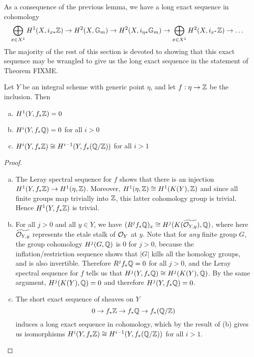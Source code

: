 As a consequence of the previous lemma, we have a long exact sequence in cohomology
\begin{equation}\label{les form1}
\bigoplus_{x\in X^1}H^1(X, i_{x*}\mathbb{Z}) \rightarrow H^2(X,\mathbb{G}_m)\rightarrow H^2(X,i_{\eta*}\mathbb{G}_m)\rightarrow \bigoplus_{x\in X^1}H^2(X, i_{x^*}\mathbb{Z})\rightarrow \dots
\end{equation}
The majority of the rest of this section is devoted to showing that this exact sequence may be wrangled to give us the long exact sequence in the statement of Theorem FIXME.
\begin{lem}
Let $Y$ be an integral scheme with generic point $\eta$, and let $f: \eta\rightarrow\mathbb{Z}$ be the inclusion.  Then
\begin{enumerate}[(a)]
\item  $H^1(Y,f_*\mathbb{Z}) =0$
\item  $H^i(Y,f_*\mathbb{Q}) =0$ for all $i>0$
\item  $H^i(Y,f_*\mathbb{Z})\cong H^{i-1}(Y,f_*(\mathbb{Q}/\mathbb{Z}))$ for all $i>1$
\end{enumerate}
\end{lem}
\begin{proof}\mbox{}
\begin{enumerate}[(a)]
\item  The Leray spectral sequence for $f$ shows that there is an injection $H^1(Y,f_*\mathbb{Z})\rightarrow H^1(\eta,\mathbb{Z})$.  Moreover, $H^1(\eta,\mathbb{Z})\cong H^1(K(Y),\mathbb{Z})$ and since all finite groups map trivially into $\mathbb{Z}$, this latter cohomology group is trivial.  Hence $H^1(Y,f_*\mathbb{Z})$ is trivial.
\item  For all $j>0$ and all $y\in Y$, we have $(R^jf_*\mathbb{Q})_x \cong H^j(K(\widetilde{\mathcal{O}_{Y,y}}),\mathbb{Q})$, where here $\widetilde{\mathcal{O}_{Y,y}}$ represents the etale stalk of $\mathcal{O}_Y$ at $y$.  Note that for \emph{any} finite group $G$, the group cohomology $H^j(G,\mathbb{Q})$ is $0$ for $j>0$, because the inflation/restriction sequence shows that $|G|$ kills all the homology groups, and is also invertible.  Therefore $R^jf_*\mathbb{Q} = 0$ for all $j>0$, and the Leray spectral sequence for $f$ tells us that $H^j(Y,f_*\mathbb{Q})\cong H^j(K(Y),\mathbb{Q})$.  By the same argument, $H^j(K(Y),\mathbb{Q}) = 0$ and therefore $H^j(Y,f_*\mathbb{Q}) = 0$.
\item  The short exact sequence of sheaves on $Y$
$$0\rightarrow f_*\mathbb{Z}\rightarrow f_*\mathbb{Q}\rightarrow f_*(\mathbb{Q}/\mathbb{Z})$$
induces a long exact sequence in cohomology, which by the result of (b) gives us isomorphisms $H^i(Y,f_*\mathbb{Z})\cong H^{i-1}(Y,f_*(\mathbb{Q}/\mathbb{Z}))$ for all $i>1$.
\end{enumerate}
\end{proof}

